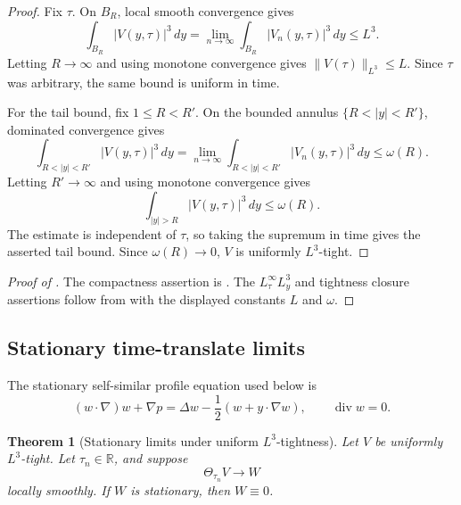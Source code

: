 \documentclass[11pt]{amsart}
\theoremstyle{plain}
\newtheorem{theorem}{Theorem}[section]
\theoremstyle{definition}
\theoremstyle{remark}
\numberwithin{equation}{section}
\newcommand{\R}{\mathbb R}
\newcommand{\divergence}{\operatorname{div}}
\begin{document}
\begin{proof}
Fix \(\tau\).  On \(B_R\), local smooth convergence gives
\[
   \int_{B_R}|V(y,\tau)|^3\,dy
   =
   \lim_{n\to\infty}\int_{B_R}|V_n(y,\tau)|^3\,dy
   \le L^3 .
\]
Letting \(R\to\infty\) and using monotone convergence gives
\(\|V(\tau)\|_{L^3}\le L\).  Since \(\tau\) was arbitrary, the same bound is
uniform in time.

For the tail bound, fix \(1\le R<R'\).  On the bounded annulus
\(\{R<|y|<R'\}\), dominated convergence gives
\[
   \int_{R<|y|<R'}|V(y,\tau)|^3\,dy
   =
   \lim_{n\to\infty}
   \int_{R<|y|<R'}|V_n(y,\tau)|^3\,dy
   \le \omega(R).
\]
Letting \(R'\to\infty\) and using monotone convergence gives
\[
   \int_{|y|>R}|V(y,\tau)|^3\,dy\le \omega(R).
\]
The estimate is independent of \(\tau\), so taking the supremum in time gives
the asserted tail bound.  Since \(\omega(R)\to0\), \(V\) is uniformly
\(L^3\)-tight.
\end{proof}

\begin{proof}[Proof of ]
The compactness assertion is .  The
\(L^\infty_\tau L^3_y\) and tightness closure assertions follow from
 with the displayed constants \(L\) and \(\omega\).
\end{proof}

\subsection{Stationary time-translate limits}

The stationary self-similar profile equation used below is
\begin{equation}\label{p2:eq:stationary-profile}
   (w\cdot\nabla)w+\nabla p
   =
   \Delta w-\frac12(w+y\cdot\nabla w),
   \qquad \divergence w=0 .
\end{equation}

\begin{theorem}[Stationary limits under uniform \(L^3\)-tightness]
\label{p2:thm:stationary-limits-tight}
Let \(V\) be uniformly \(L^3\)-tight.  Let \(\tau_n\in\R\), and suppose
\[
   \Theta_{\tau_n}V\to W
\]
locally smoothly.  If \(W\) is stationary, then \(W\equiv0\).
\end{theorem}
\end{document}
